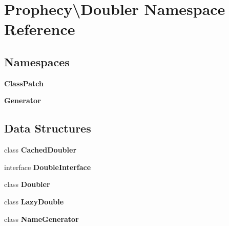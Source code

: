 \section{Prophecy\textbackslash{}Doubler Namespace Reference}
\label{namespace_prophecy_1_1_doubler}
\subsection*{Namespaces}
\begin{DoxyCompactItemize}
\item 
 {\bf Class\+Patch}
\item 
 {\bf Generator}
\end{DoxyCompactItemize}
\subsection*{Data Structures}
\begin{DoxyCompactItemize}
\item 
class {\bf Cached\+Doubler}
\item 
interface {\bf Double\+Interface}
\item 
class {\bf Doubler}
\item 
class {\bf Lazy\+Double}
\item 
class {\bf Name\+Generator}
\end{DoxyCompactItemize}
